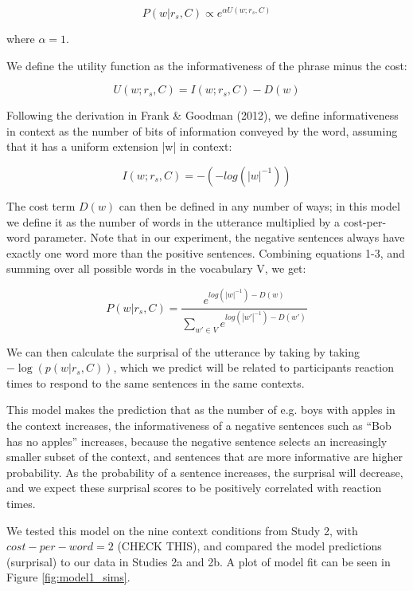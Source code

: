 \documentclass[10pt,letterpaper]{article}
\begin{document}
\begin{equation}\label{eq:pw1}
P(w | r_s, C) \propto  e^{\alpha U(w;r_s,C)}
\end{equation} 

\noindent where $\alpha=1$.

We define the utility function as the informativeness of the phrase minus the cost:

\begin{equation}\label{eq:utility}
U(w;r_s,C) = I(w;r_s, C) - D(w)
\end{equation}

Following the derivation in Frank \& Goodman (2012), we define informativeness in context as the number of bits of information conveyed by the word, assuming that it has a uniform extension |w| in context:

\begin{equation}\label{eq:info}
I(w;r_s, C) = -(-log(|w|^{-1}))
\end{equation}

\noindent The cost term $D(w)$ can then be defined in any number of ways; in this model we define it as the number of words in the utterance multiplied by a cost-per-word parameter.  Note that in our experiment, the negative sentences always have exactly one word more than the positive sentences.  Combining equations 1-3, and summing over all possible words in the vocabulary V, we get:

\begin{equation}\label{eq:pw2}
P(w | r_s, C) = \frac{ e^{log(|w|^{-1}) - D(w)}} {\sum_{w' \in V}{e^{log(|w'|^{-1}) - D(w')}}}
\end{equation}

We can then calculate the surprisal of the utterance by taking by taking $-\log(p(w|r_s,C))$, which we predict will be related to participants reaction times to respond to the same sentences in the same contexts.

This model makes the prediction that as the number of e.g. boys with apples in the context increases, the informativeness of a negative sentences such as ``Bob has no apples'' increases, because the negative sentence selects an increasingly smaller subset of the context, and sentences that are more informative are higher probability.  As the probability of a sentence increases, the surprisal will decrease, and we expect these surprisal scores to be positively correlated with reaction times.

We tested this model on the nine context conditions from Study 2, with $cost-per-word = 2$ (CHECK THIS), and compared the model predictions (surprisal) to our data in Studies 2a and 2b.  A plot of model fit can be seen in Figure \ref{fig:model1_sims}. 
\end{document}
